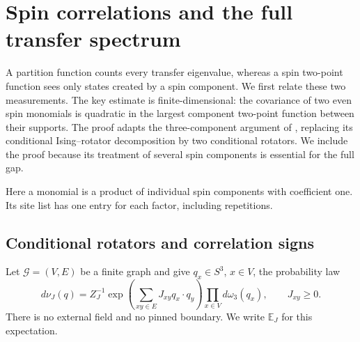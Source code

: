 \section{Spin correlations and the full transfer spectrum}
\label{sec:sector}

A partition function counts every transfer eigenvalue, whereas a spin
two-point function sees only states created by a spin component.
We first relate these two measurements. The key estimate is
finite-dimensional: the covariance of two even spin monomials is
quadratic in the largest component two-point function between their
supports. The proof adapts the three-component argument of
\cite[Section~4]{O3Pole}, replacing its conditional Ising--rotator
decomposition by two conditional rotators. We include the proof because
its treatment of several spin components is essential for the full gap.

Here a monomial is a product of individual spin components with
coefficient one. Its site list has one entry for each factor,
including repetitions.

\subsection{Conditional rotators and correlation signs}

Let $\mathcal G=(V,E)$ be a finite graph and give $q_x\in S^3$, $x\in V$,
the probability law
\begin{equation}
 d\nu_J(q)=Z_J^{-1}
 \exp\left(\sum_{xy\in E}J_{xy}q_x\cdot q_y\right)
 \prod_{x\in V}d\omega_3(q_x),
 \qquad J_{xy}\ge0.
 \label{eq:wilson-graph-law}
\end{equation}
There is no external field and no pinned boundary. We write
$\mathbb E_J$ for this expectation.

